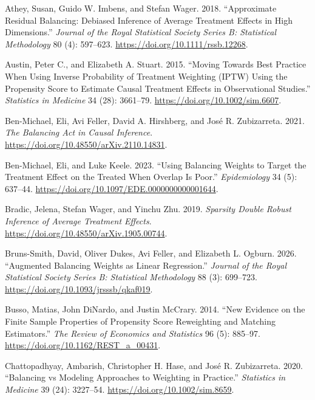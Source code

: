 \documentclass[
  12pt,
  a4paper,
]{article}
\newlength{\cslhangindent}
\newenvironment{CSLReferences}[2] %
 {\begin{list}{}{%
  \setlength{\itemindent}{0pt}
  \setlength{\leftmargin}{0pt}
  \setlength{\parsep}{0pt}
  \ifodd #1
   \setlength{\leftmargin}{\cslhangindent}
   \setlength{\itemindent}{-1\cslhangindent}
  \fi
  \setlength{\itemsep}{#2\baselineskip}}}
 {\end{list}}
\begin{document}
\protect{}\label{refs}
\begin{CSLReferences}{1}{1}
Athey, Susan, Guido W. Imbens, and Stefan Wager. 2018. {``Approximate
Residual Balancing: Debiased Inference of Average Treatment Effects in
High Dimensions.''} \emph{Journal of the Royal Statistical Society
Series B: Statistical Methodology} 80 (4): 597--623.
\url{https://doi.org/10.1111/rssb.12268}.

Austin, Peter C., and Elizabeth A. Stuart. 2015. {``Moving Towards Best
Practice When Using Inverse Probability of Treatment Weighting ({IPTW})
Using the Propensity Score to Estimate Causal Treatment Effects in
Observational Studies.''} \emph{Statistics in Medicine} 34 (28):
3661--79. \url{https://doi.org/10.1002/sim.6607}.

Ben-Michael, Eli, Avi Feller, David A. Hirshberg, and José R.
Zubizarreta. 2021. \emph{The Balancing Act in Causal Inference}.
\url{https://doi.org/10.48550/arXiv.2110.14831}.

Ben-Michael, Eli, and Luke Keele. 2023. {``Using Balancing Weights to
Target the Treatment Effect on the Treated When Overlap Is Poor.''}
\emph{Epidemiology} 34 (5): 637--44.
\url{https://doi.org/10.1097/EDE.0000000000001644}.

Bradic, Jelena, Stefan Wager, and Yinchu Zhu. 2019. \emph{Sparsity
Double Robust Inference of Average Treatment Effects}.
\url{https://doi.org/10.48550/arXiv.1905.00744}.

Bruns-Smith, David, Oliver Dukes, Avi Feller, and Elizabeth L. Ogburn.
2026. {``Augmented Balancing Weights as Linear Regression.''}
\emph{Journal of the Royal Statistical Society Series B: Statistical
Methodology} 88 (3): 699--723.
\url{https://doi.org/10.1093/jrsssb/qkaf019}.

Busso, Matias, John DiNardo, and Justin McCrary. 2014. {``New Evidence
on the Finite Sample Properties of Propensity Score Reweighting and
Matching Estimators.''} \emph{The Review of Economics and Statistics} 96
(5): 885--97. \url{https://doi.org/10.1162/REST_a_00431}.

Chattopadhyay, Ambarish, Christopher H. Hase, and José R. Zubizarreta.
2020. {``Balancing {vs} Modeling Approaches to Weighting in Practice.''}
\emph{Statistics in Medicine} 39 (24): 3227--54.
\url{https://doi.org/10.1002/sim.8659}.


\end{CSLReferences}
\end{document}
